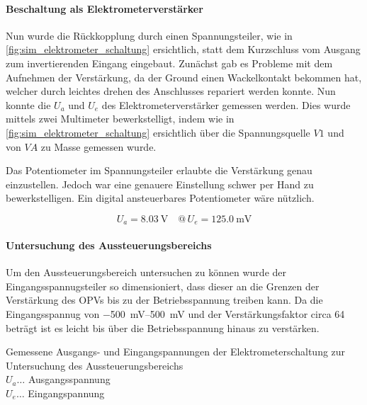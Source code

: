 \documentclass[12pt,english,ngerman]{scrartcl}
\begin{document}
\paragraph{Beschaltung als Elektrometerverstärker}
Nun wurde die Rückkopplung durch einen Spannungsteiler, wie in
\autoref{fig:sim_elektrometer_schaltung} ersichtlich, statt dem Kurzschluss vom
Ausgang zum invertierenden Eingang eingebaut. Zunächst gab es Probleme mit dem
Aufnehmen der Verstärkung, da der Ground einen Wackelkontakt bekommen hat,
welcher durch leichtes drehen des Anschlusses repariert werden konnte.
Nun konnte die $U_a$ und $U_e$ des Elektrometerverstärker gemessen werden. Dies
wurde mittels zwei Multimeter \cite{fluke175} bewerkstelligt, indem wie in
\autoref{fig:sim_elektrometer_schaltung} ersichtlich über die Spannungsquelle
$V1$ und von $VA$ zu Masse gemessen wurde.

Das Potentiometer im Spannungsteiler erlaubte die Verstärkung genau einzustellen.
Jedoch war eine genauere Einstellung schwer per Hand zu bewerkstelligen. Ein digital
ansteuerbares Potentiometer wäre nützlich.

\begin{equation}
  U_a = \SI{8.03}{\volt} \quad @\, U_e = \SI{125.0}{\milli\volt}
  \label{eq:messwert_elektro_ausgang_eingang}
\end{equation}

\paragraph{Untersuchung des Aussteuerungsbereichs} \label{sec:Versuchohnekond}
Um den Aussteuerungsbereich untersuchen zu können wurde der
Eingangsspannugsteiler so dimensioniert, dass dieser an die Grenzen der
Verstärkung des OPVs bis zu der Betriebsspannung treiben kann. Da die
Eingangsspannug von \SIrange{-500}{500}{\milli\volt} und der Verstärkungsfaktor
circa \num{64} beträgt ist es leicht bis über die Betriebsspannung hinaus zu
verstärken.


\begin{table}[H]
  \caption{Gemessene Ausgangs- und Eingangspannungen der Elektrometerschaltung
  zur Untersuchung des Aussteuerungsbereichs\\
  $U_a \dots$ Ausgangsspannung \\
  $U_e \dots$ Eingangspannung \\
  }
  \label{tab:mess_elektro_aussteurerung}
  \centering
  
\end{table}
\end{document}
